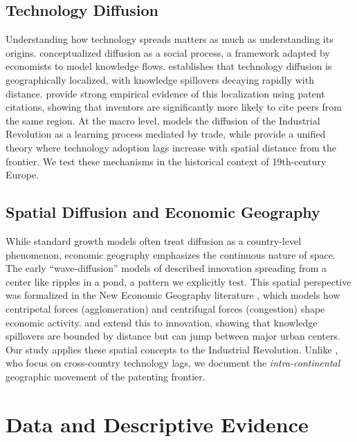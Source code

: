 \documentclass[letterpaper,12pt,leqno]{article}
\begin{document}
\subsection{Technology Diffusion}
Understanding how technology spreads matters as much as understanding its origins. \citet{rogers2003diffusion} conceptualized diffusion as a social process, a framework adapted by economists to model knowledge flows. \citet{keller2004international} establishes that technology diffusion is geographically localized, with knowledge spillovers decaying rapidly with distance. \citet{jaffe1993geographic} provide strong empirical evidence of this localization using patent citations, showing that inventors are significantly more likely to cite peers from the same region.
At the macro level, \citet{lucas2009trade} models the diffusion of the Industrial Revolution as a learning process mediated by trade, while \citet{comin2012spatial} provide a unified theory where technology adoption lags increase with spatial distance from the frontier. We test these mechanisms in the historical context of 19th-century Europe.

\subsection{Spatial Diffusion and Economic Geography}
While standard growth models often treat diffusion as a country-level phenomenon, economic geography emphasizes the continuous nature of space. The early ``wave-diffusion'' models of \citet{hagerstrand1968innovation} described innovation spreading from a center like ripples in a pond, a pattern we explicitly test.
This spatial perspective was formalized in the New Economic Geography literature \citep{krugman1991increasing}, which models how centripetal forces (agglomeration) and centrifugal forces (congestion) shape economic activity. \citet{bottazzi2003innovation} and \citet{moretti2021geography} extend this to innovation, showing that knowledge spillovers are bounded by distance but can jump between major urban centers.
Our study applies these spatial concepts to the Industrial Revolution. Unlike \citet{comin2012spatial}, who focus on cross-country technology lags, we document the \textit{intra-continental} geographic movement of the patenting frontier.





\section{Data and Descriptive Evidence}
\end{document}
